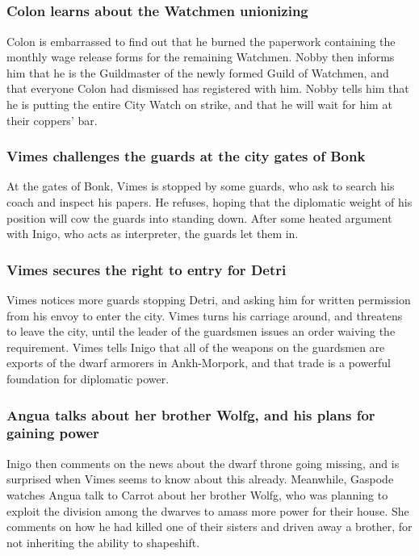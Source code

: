 \subsection{}
\subsubsection{\Gls{Colon} learns about the Watchmen unionizing}
\Gls{Colon} is embarrassed to find out that he burned the paperwork containing the monthly wage
release forms for the remaining Watchmen. \Gls{Nobby} then informs him that he is the Guildmaster
of the newly formed Guild of Watchmen, and that everyone \Gls{Colon} had dismissed has registered
with him. \Gls{Nobby} tells him that he is putting the entire City Watch on strike, and that he will
wait for him at their coppers' bar.

\subsubsection{\Gls{Vimes} challenges the guards at the city gates of Bonk}
At the gates of Bonk, \Gls{Vimes} is stopped by some guards, who ask to search his coach and inspect
his papers. He refuses, hoping that the diplomatic weight of his position will cow the guards into
standing down. After some heated argument with \Gls{Inigo}, who acts as interpreter, the guards
let them in.

\subsubsection{\Gls{Vimes} secures the right to entry for \Gls{Detri}}
\Gls{Vimes} notices more guards stopping \Gls{Detri}, and asking him for written permission from his
envoy to enter the city. \Gls{Vimes} turns his carriage around, and threatens to leave the city,
until the leader of the guardsmen issues an order waiving the requirement. \Gls{Vimes} tells
\Gls{Inigo} that all of the weapons on the guardsmen are exports of the dwarf armorers in
Ankh-Morpork, and that trade is a powerful foundation for diplomatic power.

\subsubsection{\Gls{Angua} talks about her brother \Gls{Wolfg}, and his plans for gaining power}
\Gls{Inigo} then comments on the news about the dwarf throne going missing, and is surprised when
\Gls{Vimes} seems to know about this already. Meanwhile, \Gls{Gaspode} watches \Gls{Angua} talk
to \Gls{Carrot} about her brother \Gls{Wolfg}, who was planning to exploit the division among the
dwarves to amass more power for their house. She comments on how he had killed one of their sisters
and driven away a brother, for not inheriting the ability to shapeshift.

